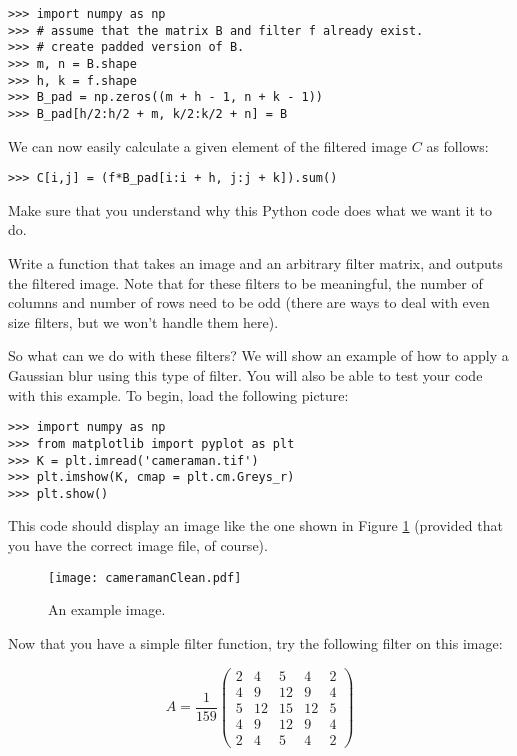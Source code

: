 \begin{lstlisting}
>>> import numpy as np
>>> # assume that the matrix B and filter f already exist.
>>> # create padded version of B.
>>> m, n = B.shape
>>> h, k = f.shape
>>> B_pad = np.zeros((m + h - 1, n + k - 1))
>>> B_pad[h/2:h/2 + m, k/2:k/2 + n] = B
\end{lstlisting}

We can now easily calculate a given element of the filtered image $C$ as follows:
\begin{lstlisting}
>>> C[i,j] = (f*B_pad[i:i + h, j:j + k]).sum()
\end{lstlisting}

Make sure that you understand why this Python code does what we want it to do.
\begin{problem}
Write a function  that takes an image and an arbitrary filter matrix, and outputs the
filtered image. Note that for these filters to be meaningful, the number of columns and number 
of rows need to be odd (there are ways to deal with even size filters, but we won't handle them here).
\end{problem}

So what can we do with these filters? We will show an example of how to apply a Gaussian blur 
using this type of filter. You will also be able to test your code with this example. 
To begin, load the following picture:

\begin{lstlisting}
>>> import numpy as np
>>> from matplotlib import pyplot as plt
>>> K = plt.imread('cameraman.tif')
>>> plt.imshow(K, cmap = plt.cm.Greys_r)
>>> plt.show()
\end{lstlisting}

This code should display an image like the one shown in Figure \ref{imfil:camclean} (provided
that you have the correct image file, of course).

\begin{figure}
\texttt{[image: cameramanClean.pdf]}
\caption{An example image.}
\label{imfil:camclean}
\end{figure}

Now that you have a simple filter function, try the following filter on this image:

\[
A = \frac{1}{159}\begin{pmatrix}
2&4&5&4&2\\
4&9&12&9&4\\
5&12&15&12&5\\
4&9&12&9&4\\
2&4&5&4&2
\end{pmatrix}
\]

